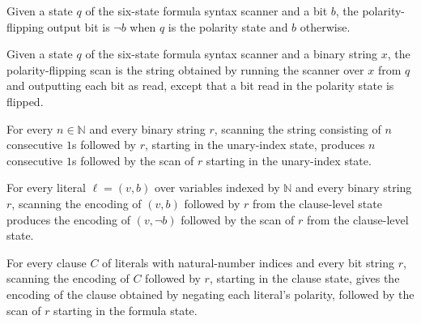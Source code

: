 \begin{definition}
\label{Complexity.tautDualBit}
\leanok
{}
Given a state $q$ of the six-state formula syntax scanner and a bit $b$, the
polarity-flipping output bit is $\neg b$ when $q$ is the polarity state and $b$
otherwise.
\end{definition}

\begin{definition}
\label{Complexity.tautDualScan}
\leanok
{}
Given a state $q$ of the six-state formula syntax scanner and a binary string $x$, the
polarity-flipping scan is the string obtained by running the scanner over $x$ from $q$
and outputting each bit as read, except that a bit read in the polarity state is
flipped.
\end{definition}

\begin{lemma}
\label{Complexity.tautDual_unary}
\leanok
{}
For every $n\in\mathbb{N}$ and every binary string $r$, scanning the string consisting
of $n$ consecutive $1$s followed by $r$, starting in the unary-index state, produces $n$
consecutive $1$s followed by the scan of $r$ starting in the unary-index state.
\end{lemma}

\begin{lemma}
\label{Complexity.tautDual_literal}
\leanok
{}
For every literal $\ell=(v,b)$ over variables indexed by $\mathbb{N}$ and every binary
string $r$, scanning the encoding of $(v,b)$ followed by $r$ from the clause-level state
produces the encoding of $(v,\neg b)$ followed by the scan of $r$ from the clause-level
state.
\end{lemma}

\begin{lemma}
\label{Complexity.tautDual_clause}
\leanok
{}
For every clause $C$ of literals with natural-number indices and every bit string $r$,
scanning the encoding of $C$ followed by $r$, starting in the clause state, gives the
encoding of the clause obtained by negating each literal's polarity, followed by the
scan of $r$ starting in the formula state.
\end{lemma}

